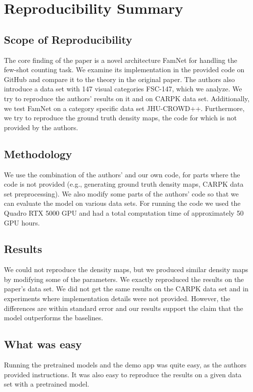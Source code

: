 \section{Reproducibility Summary}

\subsection*{Scope of Reproducibility}
The core finding of the paper is a novel architecture FamNet for handling the few-shot counting task. We examine its implementation in the provided code on GitHub and compare it to the theory in the original paper. The authors also introduce a data set with 147 visual categories FSC-147, which we analyze. We try to reproduce the authors' results on it and on CARPK data set. Additionally, we test FamNet on a category specific data set JHU-CROWD++. Furthermore, we try to reproduce the ground truth density maps, the code for which is not provided by the authors.

\subsection*{Methodology}

We use the combination of the authors' and our own code, for parts where the code is not provided (e.g., generating ground truth density maps, CARPK data set preprocessing). We also modify some parts of the authors' code so that we can evaluate the model on various data sets. For running the code we used the Quadro RTX 5000 GPU and had a total computation time of approximately 50 GPU hours.

\subsection*{Results}

We could not reproduce the density maps, but we produced similar density maps by modifying some of the parameters. 
We exactly reproduced the results on the paper's data set. We did not get the same results on the CARPK data set and in experiments where implementation details were not provided. However, the differences are within standard error and our results support the claim that the model outperforms the baselines.

\subsection*{What was easy}
Running the pretrained models and the demo app was quite easy, as the authors provided instructions. It was also easy to reproduce the results on a given data set with a pretrained model.

